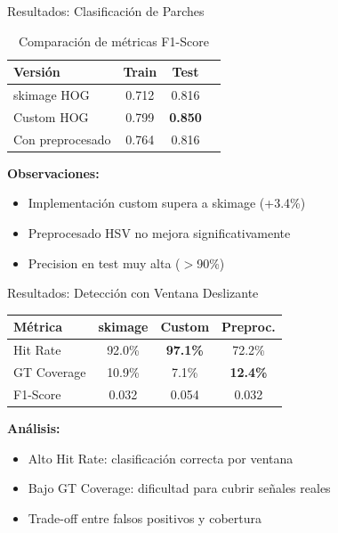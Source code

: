 \documentclass{beamer}
\begin{document}
\begin{frame}{Resultados: Clasificación de Parches}
  \begin{table}
    \centering
    \caption{Comparación de métricas F1-Score}
    \begin{tabular}{lccc}
      \toprule
      \textbf{Versión} & \textbf{Train} & \textbf{Test} \\
      \midrule
      skimage HOG & 0.712 & 0.816 \\
      Custom HOG & 0.799 & \textbf{0.850} \\
      Con preprocesado & 0.764 & 0.816 \\
      \bottomrule
    \end{tabular}
  \end{table}
  
  \vspace{0.3cm}
  \textbf{Observaciones:}
  \begin{itemize}
    \item Implementación custom supera a skimage (+3.4\%)
    \item Preprocesado HSV no mejora significativamente
    \item Precision en test muy alta ($>$90\%)
  \end{itemize}
\end{frame}

\begin{frame}{Resultados: Detección con Ventana Deslizante}
  \begin{table}
    \centering
    \footnotesize
    \begin{tabular}{lccc}
      \toprule
      \textbf{Métrica} & \textbf{skimage} & \textbf{Custom} & \textbf{Preproc.} \\
      \midrule
      Hit Rate & 92.0\% & \textbf{97.1\%} & 72.2\% \\
      GT Coverage & 10.9\% & 7.1\% & \textbf{12.4\%} \\
      F1-Score & 0.032 & 0.054 & 0.032 \\
      \bottomrule
    \end{tabular}
  \end{table}
  
  \vspace{0.3cm}
  \textbf{Análisis:}
  \begin{itemize}
    \item Alto Hit Rate: clasificación correcta por ventana
    \item Bajo GT Coverage: dificultad para cubrir señales reales
    \item Trade-off entre falsos positivos y cobertura
  \end{itemize}
\end{frame}
\end{document}
